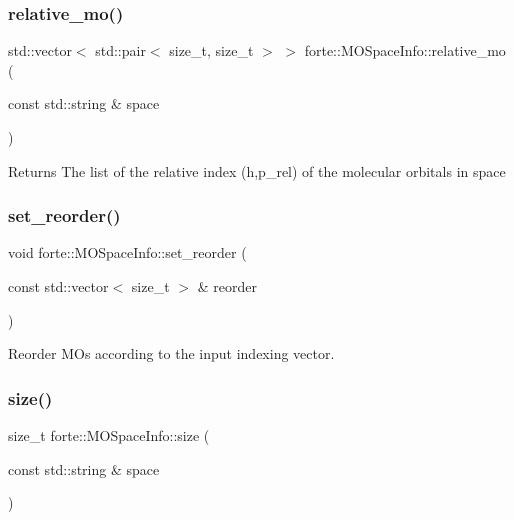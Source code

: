 \subsubsection{\texorpdfstring{relative\+\_\+mo()}{relative\_mo()}}
{\footnotesize\ttfamily std\+::vector$<$ std\+::pair$<$ size\+\_\+t, size\+\_\+t $>$ $>$ forte\+::\+M\+O\+Space\+Info\+::relative\+\_\+mo (\begin{DoxyParamCaption}\item[{const std\+::string \&}]{space }\end{DoxyParamCaption})}

\begin{DoxyReturn}{Returns}
The list of the relative index (h,p\+\_\+rel) of the molecular orbitals in space 
\end{DoxyReturn}
\mbox{\label{classforte_1_1_m_o_space_info_a937878956cf4d68ab674a37ac69654c5}} 
\subsubsection{\texorpdfstring{set\+\_\+reorder()}{set\_reorder()}}
{\footnotesize\ttfamily void forte\+::\+M\+O\+Space\+Info\+::set\+\_\+reorder (\begin{DoxyParamCaption}\item[{const std\+::vector$<$ size\+\_\+t $>$ \&}]{reorder }\end{DoxyParamCaption})}



Reorder M\+Os according to the input indexing vector. 

\mbox{\label{classforte_1_1_m_o_space_info_a7146ec7630439cf73c49ceb238fc12a6}} 
\subsubsection{\texorpdfstring{size()}{size()}}
{\footnotesize\ttfamily size\+\_\+t forte\+::\+M\+O\+Space\+Info\+::size (\begin{DoxyParamCaption}\item[{const std\+::string \&}]{space }\end{DoxyParamCaption})}

